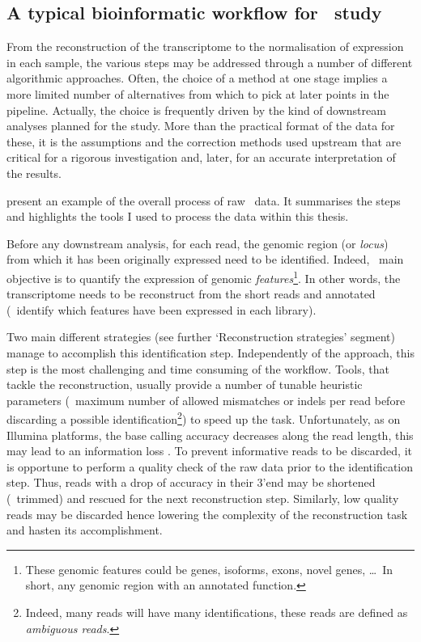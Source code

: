 \subsection{A typical bioinformatic workflow for \Rnaseq\ study}\label{sub;RNAseqworflow}

From the reconstruction of the
transcriptome to the normalisation of expression in each sample, the various
steps may be addressed through a number of different algorithmic approaches.
Often, the choice of a method at one stage implies a more limited number of
alternatives from which to pick at later points in the pipeline. Actually,
the choice is frequently driven by the kind of downstream analyses planned for
the study. More than the practical format of the data for these, it is the
assumptions and the correction methods used upstream that are critical for a
rigorous investigation and, later, for an accurate interpretation of the results.

 present an example of the overall 
process of raw \Rnaseq\ data. It summarises the steps and highlights the tools
I used to process the data within this thesis.

Before any downstream analysis, for each read, the genomic region (or
\emph{locus}) from which it has been originally expressed need to be identified.
Indeed, \Rnaseq\ main objective is to quantify the expression of genomic
\emph{features}\footnote{These genomic features could be genes, isoforms,
exons, novel genes, \dots\
In short, any genomic region with an annotated function.}. In other words,
the transcriptome needs to be reconstruct from the short reads and annotated
(\ie\ identify which features have been expressed in each library).

Two main different strategies (see further `Reconstruction strategies' segment)
manage to accomplish this identification step. Independently of the
approach, this step is the most challenging and time consuming
of the workflow. Tools, that tackle the reconstruction, usually provide a
number of tunable heuristic parameters (\eg\ maximum number of allowed mismatches
or indels per read before discarding a possible identification\footnote{Indeed,
many reads will have many identifications, these reads are defined as
\emph{ambiguous reads}.})
to speed up the task.
Unfortunately, as on Illumina platforms, the base calling accuracy decreases
along the read length, this may lead to an information loss .
To prevent informative reads to be discarded, it is opportune to perform a quality
check of the raw data prior to the identification step. Thus, reads with a drop of
accuracy in their 3'end may be shortened (\ie\ trimmed) and rescued for the next
reconstruction step. Similarly, low quality reads may be discarded hence
lowering the complexity
of the reconstruction task and hasten its accomplishment.

